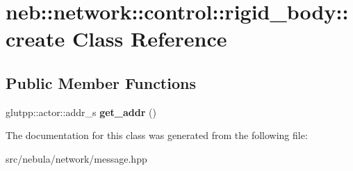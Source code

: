 \hypertarget{classneb_1_1network_1_1control_1_1rigid__body_1_1create}{
\section{neb::network::control::rigid\_\-body::create Class Reference}
\label{classneb_1_1network_1_1control_1_1rigid__body_1_1create}
}
\subsection*{Public Member Functions}
\begin{DoxyCompactItemize}
\item 
\hypertarget{classneb_1_1network_1_1control_1_1rigid__body_1_1create_af3941f85f8c8499440492a4b4373231f}{
glutpp::actor::addr\_\-s {\bfseries get\_\-addr} ()}
\label{classneb_1_1network_1_1control_1_1rigid__body_1_1create_af3941f85f8c8499440492a4b4373231f}

\end{DoxyCompactItemize}


The documentation for this class was generated from the following file:\begin{DoxyCompactItemize}
\item 
src/nebula/network/message.hpp\end{DoxyCompactItemize}
